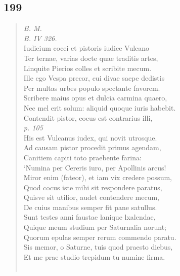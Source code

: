 \documentclass[11pt, a4paper]{report}
\begin{document}
            \subsection*{199}
      \begin{verse}
      \textit{B. M.} \\ \textit{B. IV 326.} \\ Iudieium cocei et pistoris iudiee Vulcano \\ Ter ternae, varias docte quae traditis artes, \\ Linquite Pierios colles et scribite mecum. \\ Ille ego Vespa precor, cui divae saepe dedistis \\ Per multas urbes populo spectante favorem. \\ Scribere maius opus et dulcia carmina quaero, \\ Nec mel erit solum: aliquid quoque iuris habebit. \\ Contendit pistor, cocus est contrarius illi, \\ \textit{p. 105} \\ His est Vulcanus iudex, qui novit utrosque. \\ Ad causam pistor procedit primus agendam, \\ Canitiem capiti toto praebente farina: \\ ‘Numina per Cereris iuro, per Apollinis arcus! \\ Miror enim (fateor), et iam vix credere possum, \\ Quod cocus iste mihi sit respondere paratus, \\ Quisve sit utilior, audet contendere mecum, \\ De cuius manibus semper fit pane satullus. \\ Sunt testes anni faustae lanique lxalendae, \\ Quique meum studium per Saturnalia norunt; \\ Quorum epulas semper rerum commendo paratu. \\ Sis memor, o Saturne, tuis quod praesto diebus, \\ Et me prae studio trepidum tu numine firma. \\ 
        ﻿\pagebreak 

\end{verse}
\end{document}
